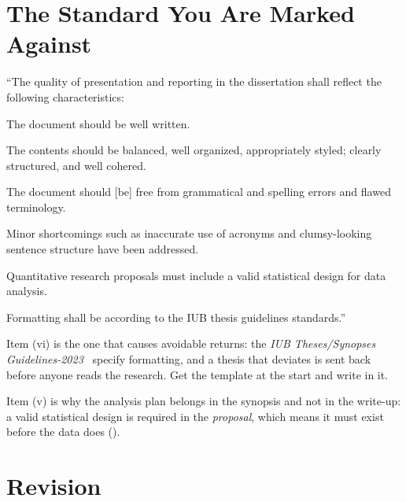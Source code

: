\section{The Standard You Are Marked Against}

\begin{regbox}
``The quality of presentation and reporting in the dissertation shall reflect
the following characteristics:
\begin{tight}
  \item[(i)] The document should be well written.
  \item[(ii)] The contents should be balanced, well organized, appropriately
    styled; clearly structured, and well cohered.
  \item[(iii)] The document should [be] free from grammatical and spelling
    errors and flawed terminology.
  \item[(iv)] Minor shortcomings such as inaccurate use of acronyms and
    clumsy-looking sentence structure have been addressed.
  \item[(v)] Quantitative research proposals must include a valid statistical
    design for data analysis.
  \item[(vi)] Formatting shall be according to the IUB thesis guidelines
    standards.''
\end{tight}
\end{regbox}

\begin{conceptbox}
Item (vi) is the one that causes avoidable returns: the
\emph{IUB Theses/Synopses Guidelines-2023}~\cite{iub2023theses} specify
formatting, and a thesis that deviates is sent back before anyone reads the
research. Get the template at the start and write in it.

\medskip
Item (v) is why the analysis plan belongs in the synopsis and not in the
write-up: a valid statistical design is required in the \emph{proposal}, which
means it must exist before the data does ().
\end{conceptbox}

\section{Revision}


